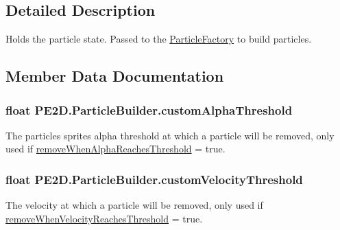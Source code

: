 \subsection{Detailed Description}
Holds the particle state. Passed to the \hyperlink{class_p_e2_d_1_1_particle_factory}{Particle\+Factory} to build particles. 



\subsection{Member Data Documentation}
\hypertarget{struct_p_e2_d_1_1_particle_builder_a4f81feb8debd8a2842d2d1b49fa842e2}{}
\subsubsection[{custom\+Alpha\+Threshold}]{\setlength{\rightskip}{0pt plus 5cm}float P\+E2\+D.\+Particle\+Builder.\+custom\+Alpha\+Threshold}\label{struct_p_e2_d_1_1_particle_builder_a4f81feb8debd8a2842d2d1b49fa842e2}


The particles sprites alpha threshold at which a particle will be removed, only used if \hyperlink{struct_p_e2_d_1_1_particle_builder_a18a773bd0ec19ac1eeb2e86603bd3395}{remove\+When\+Alpha\+Reaches\+Threshold} = true. 

\hypertarget{struct_p_e2_d_1_1_particle_builder_a5feb3a73d241bbf14bd2a51ec94835b2}{}
\subsubsection[{custom\+Velocity\+Threshold}]{\setlength{\rightskip}{0pt plus 5cm}float P\+E2\+D.\+Particle\+Builder.\+custom\+Velocity\+Threshold}\label{struct_p_e2_d_1_1_particle_builder_a5feb3a73d241bbf14bd2a51ec94835b2}


The velocity at which a particle will be removed, only used if \hyperlink{struct_p_e2_d_1_1_particle_builder_a2c37b78b4c75113fb9703c760cd1a34c}{remove\+When\+Velocity\+Reaches\+Threshold} = true. 

